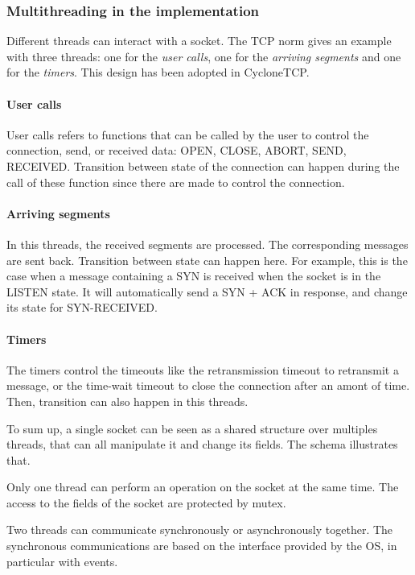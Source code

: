 \documentclass[a4paper, 10pt]{article}
\begin{document}
    \subsubsection{Multithreading in the implementation}

    Different threads can interact with a socket. The TCP norm gives an example with
    three threads: one for the \emph{user calls}, one for the \emph{arriving segments}
    and one for the \emph{timers}. This design has been adopted in CycloneTCP.
    
    \paragraph{User calls}
    User calls refers to functions that can be called by the user to control the connection,
    send, or received data: OPEN, CLOSE, ABORT, SEND, RECEIVED. Transition between state of
    the connection can happen during the call of these function since there are made to control
    the connection.

    \paragraph{Arriving segments}
    In this threads, the received segments are processed. The corresponding messages are sent back.
    Transition between state can happen here. For example, this is the case when a message containing
    a SYN is received when the socket is in the LISTEN state. It will automatically send a SYN + ACK in
    response, and change its state for SYN-RECEIVED.

    \paragraph{Timers}
    The timers control the timeouts like the retransmission timeout to retransmit a message, or
    the time-wait timeout to close the connection after an amont of time. Then, transition can also
    happen in this threads.

    To sum up, a single socket can be seen as a shared structure over multiples threads, that can all
    manipulate it and change its fields. The schema illustrates that.
    
    Only one thread can perform an operation on the socket at the same time. The access to the fields of
    the socket are protected by mutex.

    Two threads can communicate synchronously or asynchronously together. The synchronous communications are based on
    the interface provided by the OS, in particular with events.
\end{document}
